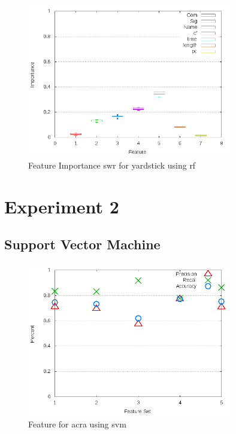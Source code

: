 \begin{figure}[!t]
\centering
\includegraphics[width=0.8\textwidth]{images/rf/test_1/yardstick_importance.png}
\caption{Feature Importance \gls{swr} for yardstick using \gls{rf}}
\label{fig:test_1_yardstick_rf_importance}
\end{figure}


\section{Experiment 2}
\label{app_sec:experiment_2}

\subsection{Support Vector Machine}
\label{app_sub:experiment_2_svm}

\begin{figure}
\centering
\includegraphics[width=0.8\textwidth]{images/svm/test_3/acra_sample_range.png}
\caption{Feature for acra using \gls{svm}}
\label{fig:test_3_acra_svm}
\end{figure}

